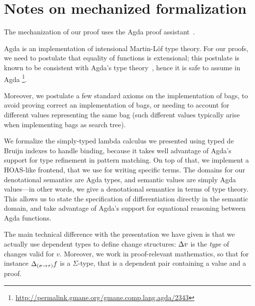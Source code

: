 \section{Notes on mechanized formalization}
\label{sec:formal}

The mechanization of our proof uses the Agda
proof assistant~\citep{agda-head}.

Agda is an implementation of intensional Martin-Löf type theory.
For our proofs, we need to postulate that equality of functions is
extensional; this postulate is known to be consistent with Agda's
type theory~\citep{Hofmann96}, hence it is safe to assume in Agda%
\footnote{\url{http://permalink.gmane.org/gmane.comp.lang.agda/2343}}.

Moreover, we postulate a few standard axioms on the
implementation of bags, to avoid proving correct an
implementation of bags, or needing to account for different
values representing the same bag (such different values typically
arise when implementing bags as search tree).

We formalize the simply-typed lambda calculus we presented using
typed de Bruijn indexes to handle binding, because it takes well
advantage of Agda's support for type refinement in pattern
matching. On top of that, we implement a HOAS-like frontend, that
we use for writing specific terms.
The domains for our denotational
semantics are Agda types, and semantic values are simply Agda
values---in other words, we give a denotational semantics in
terms of type theory.
%
This allows us to state the specification of differentiation
directly in the semantic domain, and take advantage of Agda's
support for equational reasoning between Agda functions.

The main technical difference with the presentation we have given
is that we actually use dependent types to define change
structures: $\Change{v}$ is the \emph{type} of changes valid for
$v$. Moreover, we work in proof-relevant mathematics, so that for
instance $\Change[\Fun*{\Gs}{\Gt}]{f}$ is a $\Sigma$-type, that
is a dependent pair containing a value and a proof.
